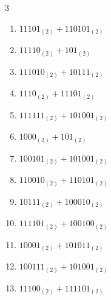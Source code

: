 \begin{multicols}{3}
\begin{enumerate}

  \item $11101_{(2)} + 110101_{(2)}$


  \item $11110_{(2)} + 101_{(2)}$


  \item $111010_{(2)} + 10111_{(2)}$


\columnbreak %

  \item $1110_{(2)} + 11101_{(2)}$


  \item $111111_{(2)} + 101001_{(2)}$


  \item $1000_{(2)} + 101_{(2)}$


  \item $100101_{(2)} + 101001_{(2)}$


  \item $110010_{(2)} + 110101_{(2)}$


  \item $10111_{(2)} + 100010_{(2)}$


  \item $111101_{(2)} + 100100_{(2)}$


  \item $10001_{(2)} + 101011_{(2)}$


  \item $100111_{(2)} + 101001_{(2)}$


  \item $11100_{(2)} + 111101_{(2)}$



\end{enumerate}
\end{multicols}
